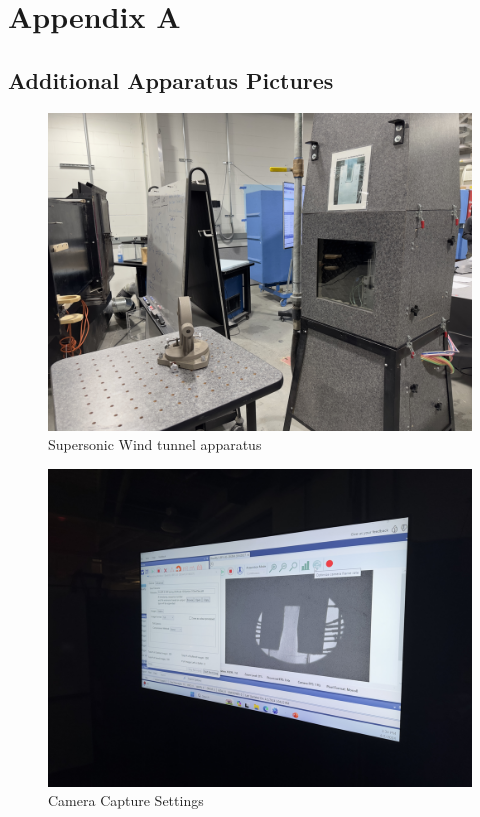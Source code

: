 \chapter{Appendix A}

\section{Additional Apparatus Pictures} \label{sec:additional_apparatus}

\begin{figure}[htpb]
    \centering
    \includegraphics[width=0.75\linewidth]{Figures/back_of_supersonic_wind_tunnel.jpeg}
    \caption[Supersonic Wind tunnel apparatus]{Supersonic Wind tunnel apparatus}
    \label{fig: SuperSonicWindTunnel}
\end{figure}

\begin{figure}[htpb]
    \centering
    \includegraphics[width=0.75\linewidth]{Figures/camera_capture_settings.jpeg}
    \caption[Camera Capture Settings]{Camera Capture Settings}
    \label{fig: CameraCaptureSettings}
\end{figure}

